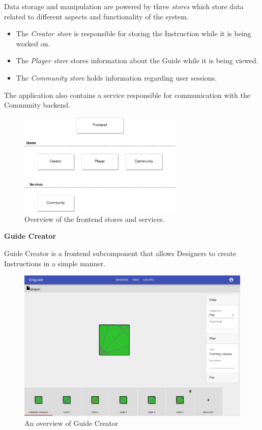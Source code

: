 Data storage and manipulation are powered by three \textit{stores} which store data related to different aspects and functionality of the system.

\begin{itemize}
	\item The \textit{Creator store} is responsible for storing the Instruction while it is being worked on.
	\item The \textit{Player store} stores information about the Guide while it is being viewed.
	\item The \textit{Community store} holds information regarding user sessions.
\end{itemize}

The application also contains a service responsible for communication with the Community backend.

\begin{figure}[hbt]
  \caption{Overview of the frontend stores and services.}
  \centering
    \includegraphics[width=0.7\textwidth]{assets/3-frontend-stores-services.png}
\end{figure}


\clearpage
\textbf{Guide Creator}

\medskip

Guide Creator is a frontend subcomponent that allows Designers to create Instructions in a simple manner.


\begin{figure}[hbt]
  \caption{An overview of Guide Creator}
  \centering
    \includegraphics[width=\textwidth]{assets/3-component-creator.png}
\end{figure}


